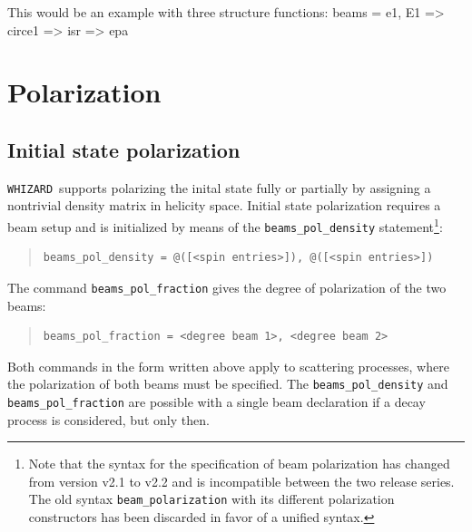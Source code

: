 \documentclass[12pt]{book}
\newenvironment{code}%
  {\begingroup\footnotesize
   \quote
   \Verbatim}%
  {\endVerbatim
   \endquote
   \endgroup\noindent}
\newcommand{\ttt}[1]{\texttt{#1}}
\newcommand{\whizard}{\ttt{WHIZARD}}
\begin{document}
This would be an example with three structure functions:
\begin{code}
beams = e1, E1 => circe1 => isr => epa
\end{code}


\section{Polarization}
\label{sec:polarization}


\subsection{Initial state polarization}
\label{sec:initialpolarization}

\whizard\ supports polarizing the inital state fully or partially by
assigning a nontrivial density matrix in helicity space.
Initial state polarization requires a beam setup and is initialized by
means of the \ttt{beams\_pol\_density} statement\footnote{Note that
  the syntax for the specification of beam polarization has changed
  from version v2.1 to v2.2 and is incompatible between the two
  release series. The old syntax \ttt{beam\_polarization} with its
  different polarization constructors has been discarded in favor of a
  unified syntax.}:
\begin{quote}
\begin{footnotesize}
\begin{verbatim}
beams_pol_density = @([<spin entries>]), @([<spin entries>])
\end{verbatim}
\end{footnotesize}
\end{quote}
The command \ttt{beams\_pol\_fraction} gives the degree of
polarization of the two beams:
\begin{quote}
\begin{footnotesize}
\begin{verbatim}
beams_pol_fraction = <degree beam 1>, <degree beam 2>
\end{verbatim}
\end{footnotesize}
\end{quote}
Both commands in the form written above apply to scattering processes,
where the polarization of both beams must be specified. The
\ttt{beams\_pol\_density} and \ttt{beams\_pol\_fraction} are possible
with a single beam declaration if a decay process is considered, but
only then.
\end{document}
